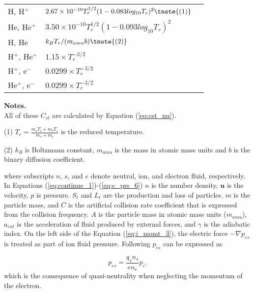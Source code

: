 \documentclass[journal, onecolumn]{aastex631}
\begin{document}
\begin{CJK*}{UTF8}{gbsn}
\begin{table}[!t]
\begin{center}
\begin{threeparttable}[t]
\begin{tabular}{lll}
\midrule
  H, H$^+$ &  $2.67\times 10^{-10}T^{1/2}_{r}(1-0.083 log_{10}T_{r})^2\tnote{(1)}$&\cite{Schunk1980} \\
  He, He$^+$&  $3.50\times 10^{-10}T^{1/2}_{r}(1-0.093 log_{10}T_{r})^2$&\cite{Schunk1980}\\
  H, He&   $k_{B}T_{r}/(m_{amu}b)\tnote{(2)}\ $&\cite{Mason1970}\\
  H$^+$, He$^+$& $1.15\times T_{r}^{-3/2}$&\cite{Schunk1980}\\
  H$^+$, e$^-$&   $0.0299\times T_{e}^{-3/2}$&\cite{Schunk1980}\\
  He$^+$, e$^-$&  $0.0299\times T_{e}^{-3/2}$&\cite{Schunk1980}\\
\bottomrule

\end{tabular}\label{tab:cls_net}
\textbf{Notes.}\\
All of these $C_{st}$ are calculated by Equation (\ref{eq:cst_nu}).
\begin{tablenotes}
\item[(1)]$T_r = \frac{m_sT_t+m_tT_s}{m_s+m_t}$ is the reduced temperature.
\item[(2)]$k_B$ is Boltzmann constant, $m_{amu}$ is the mass in atomic mass units and $b$ is the binary diffusion coefficient.
\end{tablenotes}
\end{threeparttable}
\end{center}
\end{table}
where subscripts $n$, $s$, and $e$ denote neutral, ion, and electron fluid, respectively. In Equations (\ref{eq:continue_1})-(\ref{eq:e_prs_6}) $n$ is the number density, $\textbf{u}$ is the velocity, $p$ is pressure. $S_{t}$ and $L_{t}$ are the production and loss of particles. $m$ is the particle mass, and $C$ is the artificial collision rate coefficient that is expressed from the collision frequency. $A$ is the particle mass in atomic mass units ($m_{amu}$), $a_{ext}$ is the acceleration of fluid produced by external forces, and $\gamma$ is the adiabatic index. On the left side of the Equation (\ref{eq:i_momt_3}), the electric force $-\nabla p_{es}$ is treated as part of ion fluid pressure. Following \cite{Dong2017} $p_{es}$ can be expressed as

\begin{equation}\label{eq: QN ve}
p_{es} = \frac {q_{s}n_{s}}{en_{e}}p_{e}.
\end{equation}
which is the consequence of quasi-neutrality when neglecting the momentum of the electron.


\end{CJK*}
\end{document}
